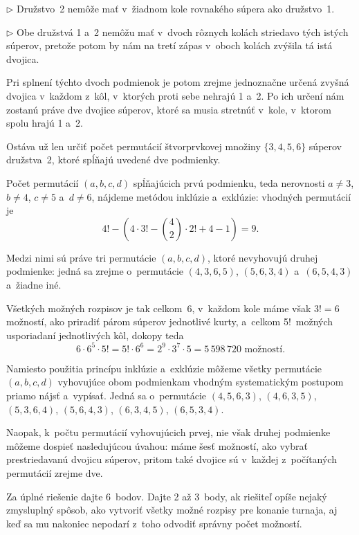 {\smallskip
\item{$\triangleright$}
Družstvo~2 nemôže mať v~žiadnom kole rovnakého súpera ako družstvo~1.

\item{$\triangleright$}
Obe družstvá 1 a~2 nemôžu mať v~dvoch rôznych kolách striedavo
tých istých súperov, pretože potom by nám na tretí zápas v~oboch kolách
zvýšila tá istá dvojica.

\smallskip
Pri splnení týchto dvoch podmienok je potom zrejme jednoznačne určená
zvyšná dvojica v~každom z~kôl, v~ktorých proti sebe nehrajú 1 a~2.
Po ich určení nám zostanú práve dve dvojice súperov, ktoré sa
musia stretnúť v~kole, v~ktorom spolu hrajú 1 a~2.

Ostáva už len určiť počet permutácií
štvorprvkovej množiny $\{3,4,5,6\}$ súperov družstva~2, ktoré spĺňajú
uvedené dve podmienky.

Počet permutácií $(a,b,c,d)$ spĺňajúcich prvú podmienku, teda nerovnosti
$a\ne3$, $b\ne4$, $c\ne5$ a~$d\ne6$, nájdeme metódou inklúzie a~exklúzie:
vhodných permutácií je
$$
4!-\left(4\cdot3!-\binom42\cdot 2!+4-1\right)=9.
$$

Medzi nimi sú práve tri permutácie $(a,b,c,d)$, ktoré nevyhovujú druhej
podmienke:
jedná sa zrejme o~permutácie $(4,3,6,5)$, $(5,6,3,4)$ a~$(6,5,4,3)$ a~žiadne iné.

Všetkých možných rozpisov je tak celkom~6, v~každom kole máme však $3!=6$
možností, ako priradiť párom súperov jednotlivé kurty, a~celkom 5!~možných usporiadaní
jednotlivých kôl, dokopy teda
$$
6\cdot6^5\cdot5!=5!\cdot6^6=2^9\cdot3^7\cdot5=5\,598\,720 \text{ možností}.
$$

\poznamka
Namiesto použitia princípu inklúzie a~exklúzie %
môžeme všetky permutácie $(a,b,c,d)$
vyhovujúce obom podmienkam vhodným systematickým postupom priamo nájsť
a~vypísať. Jedná sa o~permutácie
$(4,5,6,3)$,
$(4,6,3,5)$,
$(5,3,6,4)$,
$(5,6,4,3)$,
$(6,3,4,5)$,
$(6,5,3,4)$.

Naopak, k~počtu permutácií vyhovujúcich prvej, nie však druhej podmienke môžeme dospieť
nasledujúcou úvahou: máme šesť možností, ako vybrať prestriedavanú dvojicu súperov,
pritom také dvojice sú v~každej z~počítaných permutácií zrejme dve.


\nobreak\medskip\petit\noindent
Za úplné riešenie dajte 6~bodov.
Dajte 2 až 3~body, ak riešiteľ opíše nejaký zmysluplný spôsob,
ako vytvoriť všetky možné rozpisy pre konanie turnaja, aj keď sa
mu nakoniec nepodarí z~toho odvodiť správny počet možností.

\endpetit
}

